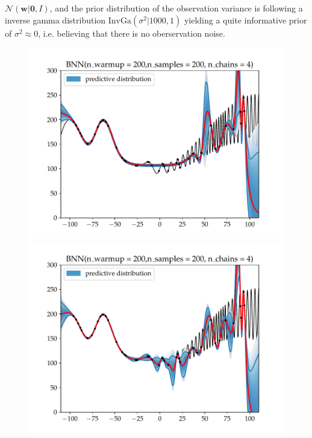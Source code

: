 
$\mathcal{N}(\textbf{w}|\bm{0},I)$, and the prior distribution of the observation
variance is following a inverse gamma distribution $\text{InvGa}(\sigma^2|1000,1)$ yielding a quite 
informative prior of $\sigma^2 \approx 0$, i.e. believing that there is no oberservation noise.

\begin{figure}[H]
    \centering
    \begin{minipage}[b]{0.49\textwidth}
     \includegraphics[width=\textwidth]{Pictures/Test4_BNNhu-10.pdf}
    \end{minipage}
    \hfill
    \begin{minipage}[b]{0.49\textwidth}
      \includegraphics[width=\textwidth]{Pictures/Test4_BNNhu-50.pdf}

\end{minipage}
\end{figure}
